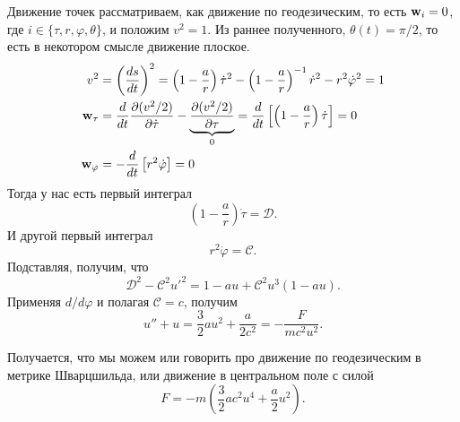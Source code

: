 Движение точек рассматриваем, как движение по геодезическим, то есть $\mbox{\boldmath $\mathrm{w}$}_i = 0$, где $i \in \{\tau, r, \varphi, \theta\}$, и положим $v^2=1$. Из раннее полученного, $\theta (t) = \pi / 2$, то есть в некотором смысле движение плоское.
\begin{align}
    v^2 &= 
    \left(
    \frac{ds}{dt} \right)^2 = \left(1 - \frac{a}{r} \right) \dot{\tau}^2
    - \left(1 - \frac{a}{r} \right)^{-1} \dot{r}^2 - r^2 \dot{\varphi}^2 = 1 \\
    \mbox{\boldmath $\mathrm{w}$}_\tau &=
    \frac{d}{dt} \frac{\partial (v^2/2)}{\partial \dot{\tau}} -
    \underbrace{\frac{\partial (v^2/2)}{\partial \tau}}_{0} =
    \frac{d}{dt} \left[\left(
               1 -  \frac{a}{r} 
            \right) \dot{\tau}\right] = 0 \\
    \mbox{\boldmath $\mathrm{w}$}_\varphi &= 
    - \frac{d}{dt} \left[
        r^2 \dot{\varphi}
    \right] = 0
\end{align}
Тогда у нас есть первый интеграл
\begin{equation}
    \left(1 - \frac{a}{r} \right) \dot{\tau} = \mathcal D.
\end{equation}
И другой первый интеграл
\begin{equation}
    r^2 \dot{\varphi} = \mathcal C.
\end{equation}
Подставляя, получим, что
\begin{equation}
    \mathcal D^2 - \mathcal C^2 u'^2 = 1 - au + \mathcal C^2 u^3 (1 - au).
\end{equation}
Применяя $d/d\varphi$ и полагая $\mathcal C = c$, получим 
\begin{equation}
     u'' + u = \frac{3}{2} a u^2 + \frac{a}{2c^2} = - \frac{F}{mc^2u^2}.
 \end{equation} 

Получается, что мы можем или говорить про движение по геодезическим в метрике Шварцшильда, или движение в центральном поле с силой
\begin{equation}
    F =  - m \left(\frac{3}{2} a c^2 u^4 + \frac{a}{2} u^2\right).
\end{equation}



